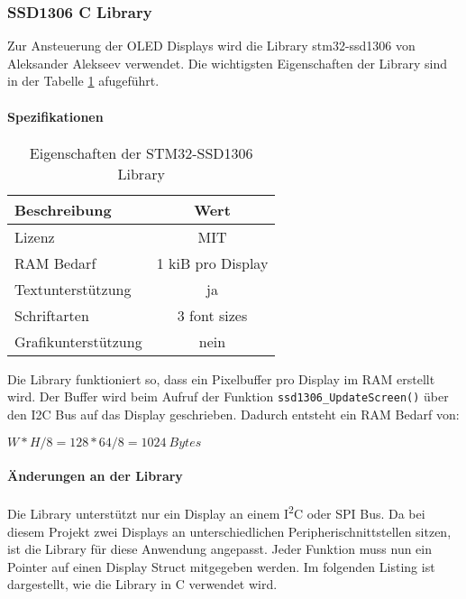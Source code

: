 \subsubsection{SSD1306 C Library}
\label{sec:Library_ssd1306}

Zur Ansteuerung der OLED Displays wird die Library stm32-ssd1306 von Aleksander Alekseev \cite{github-stm32-ssd1306} verwendet. Die wichtigsten Eigenschaften der Library sind in der Tabelle \ref{tab:LibSSD1306} afugeführt.

\paragraph{Spezifikationen}

\begin{table}[H]
	\centering
	\begin{tabular}{|l|c|}
		\hline
		\textbf{Beschreibung} & \textbf{Wert}     \\ \hline
		Lizenz                & MIT               \\ \hline
		RAM Bedarf            & 1 kiB pro Display \\ \hline
		Textunterstützung     & ja                \\ \hline
		Schriftarten          & 3 font sizes      \\ \hline
		Grafikunterstützung   & nein              \\ \hline
	\end{tabular}
	\caption{Eigenschaften der STM32-SSD1306 Library}
	\label{tab:LibSSD1306}
\end{table}

Die Library funktioniert so, dass ein Pixelbuffer pro Display im RAM erstellt wird.
Der Buffer wird beim Aufruf der Funktion \texttt{ssd1306\_UpdateScreen()} über den I2C Bus auf das Display geschrieben.
Dadurch entsteht ein RAM Bedarf von:

${W * H / 8 = 128 * 64 / 8 = 1024\ \si{Bytes}}$

\paragraph{Änderungen an der Library}

Die Library unterstützt nur ein Display an einem I\textsuperscript{2}C oder SPI Bus. Da bei diesem Projekt zwei Displays an unterschiedlichen Peripherischnittstellen sitzen, ist die Library für diese Anwendung angepasst.
Jeder Funktion muss nun ein Pointer auf einen Display Struct mitgegeben werden.
Im folgenden Listing ist dargestellt, wie die Library in C verwendet wird.


